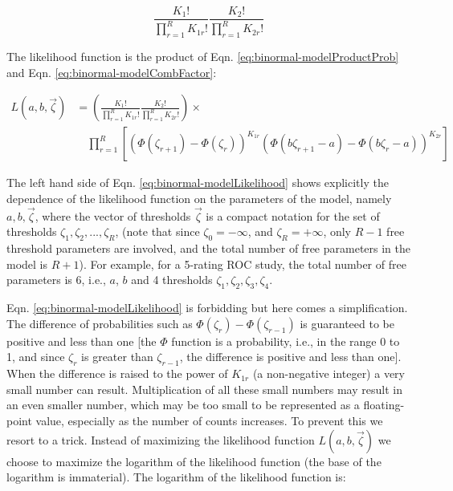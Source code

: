 \documentclass[
]{book}
\begin{document}
\begin{equation} 
\frac{K_1!}{\prod_{r=1}^{R}K_{1r}!}\frac{K_2!}{\prod_{r=1}^{R}K_{2r}!}
\label{eq:binormal-modelCombFactor}
\end{equation}

The likelihood function is the product of Eqn. \eqref{eq:binormal-modelProductProb} and Eqn. \eqref{eq:binormal-modelCombFactor}:

\begin{equation} 
\begin{split}
L\left ( a,b,\overrightarrow{\zeta} \right ) &= \left (\frac{K_1!}{\prod_{r=1}^{R}K_{1r}!}\frac{K_2!}{\prod_{r=1}^{R}K_{2r}!}  \right ) \times \\
&\quad\prod_{r=1}^{R}\left [\left (\Phi\left ( \zeta_{r+1}  \right ) - \Phi\left ( \zeta_r  \right )  \right )^{K_{1r}} \left (\Phi\left ( b\zeta_{r+1}-a  \right ) - \Phi\left ( b\zeta_r-a  \right )  \right )^{K_{2r}}  \right ]
\end{split}
\label{eq:binormal-modelLikelihood}
\end{equation}

The left hand side of Eqn. \eqref{eq:binormal-modelLikelihood} shows explicitly the dependence of the likelihood function on the parameters of the model, namely \(a,b,\overrightarrow{\zeta}\), where the vector of thresholds \(\overrightarrow{\zeta}\) is a compact notation for the set of thresholds \(\zeta_1,\zeta_2,...,\zeta_R\), (note that since \(\zeta_0 = -\infty\), and \(\zeta_R = +\infty\), only \(R-1\) free threshold parameters are involved, and the total number of free parameters in the model is \(R+1\)). For example, for a 5-rating ROC study, the total number of free parameters is 6, i.e., \(a\), \(b\) and 4 thresholds \(\zeta_1,\zeta_2,\zeta_3,\zeta_4\).

Eqn. \eqref{eq:binormal-modelLikelihood} is forbidding but here comes a simplification. The difference of probabilities such as \(\Phi\left ( \zeta_r \right )-\Phi\left ( \zeta_{r-1} \right )\) is guaranteed to be positive and less than one {[}the \(\Phi\) function is a probability, i.e., in the range 0 to 1, and since \(\zeta_r\) is greater than \(\zeta_{r-1}\), the difference is positive and less than one{]}. When the difference is raised to the power of \(K_{1r}\) (a non-negative integer) a very small number can result. Multiplication of all these small numbers may result in an even smaller number, which may be too small to be represented as a floating-point value, especially as the number of counts increases. To prevent this we resort to a trick. Instead of maximizing the likelihood function \(L\left ( a,b,\overrightarrow{\zeta} \right )\) we choose to maximize the logarithm of the likelihood function (the base of the logarithm is immaterial). The logarithm of the likelihood function is:
\end{document}
